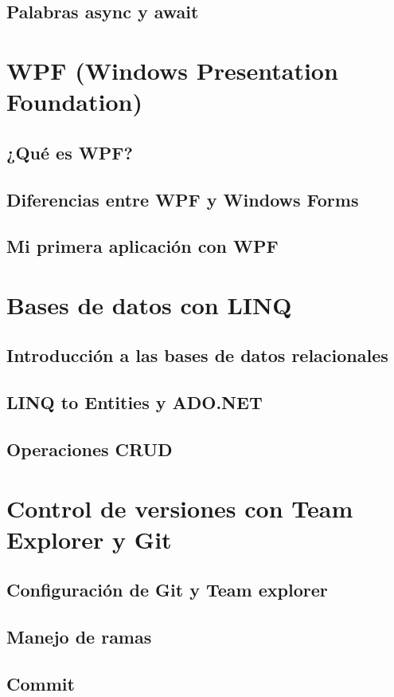 \documentclass[12pt,a4paper]{report}
\begin{document}
\section{Palabras async y await}

\chapter{WPF (Windows Presentation Foundation)}
\section{¿Qué es WPF?}
\section{Diferencias entre WPF y Windows Forms}
\section{Mi primera aplicación con WPF}

\chapter{Bases de datos con LINQ}
\section{Introducción a las bases de datos relacionales}
\section{LINQ to Entities y ADO.NET}
\section{Operaciones CRUD}

\chapter{Control de versiones con Team Explorer y Git}
\section{Configuración de Git y Team explorer}
\section{Manejo de ramas}
\section{Commit}
\end{document}
